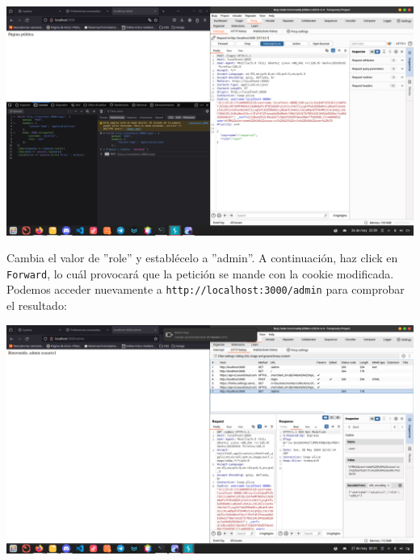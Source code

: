 \begin{center}
    \includegraphics[scale=0.15]{imagenes/Captura desde 2024-05-26 23-59-16.png}
\end{center}

Cambia el valor de ''role'' y establécelo a ''admin''. A continuación, haz click en \texttt{Forward}, lo cuál provocará que la petición se mande con la cookie modificada. Podemos acceder nuevamente a \texttt{http://localhost:3000/admin} para comprobar el resultado:

\begin{center}
    \includegraphics[scale=0.15]{imagenes/Captura desde 2024-05-27 00-01-34.png}
\end{center}